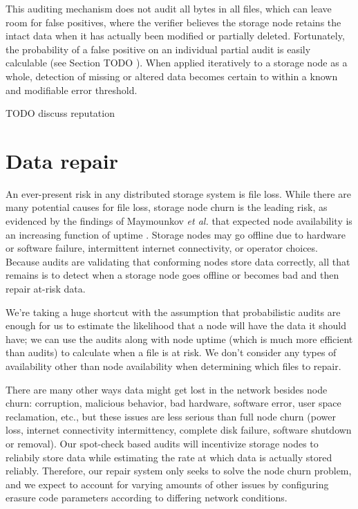 \documentclass[11pt,fleqn,openany]{book}
\newcommand{\todo}[1]{{\color{red} TODO #1 }}
\begin{document}
This auditing mechanism does not audit all bytes in all files, which can
leave room for false positives, where the verifier believes the storage node
retains the intact data when it has actually been modified or partially
deleted. Fortunately, the probability of a false positive on an individual
partial audit is easily calculable (see Section \todo{}). When applied
iteratively to a storage node as a whole, detection of missing or altered data
becomes certain to within a known and modifiable error threshold.

\todo{discuss reputation}

\section{Data repair}

An ever-present risk in any distributed storage system is file loss. While there
are many potential causes for file loss, storage node churn is the leading
risk, as evidenced by the findings of Maymounkov {\em et al.} that expected node
availability is an increasing function of uptime \cite{kad}. Storage nodes
may go offline due to hardware or software failure, intermittent internet
connectivity, or operator choices.
Because audits are validating that conforming nodes store data correctly, all
that remains is to detect when a storage node goes offline or becomes bad and
then repair at-risk data.

We're taking a huge shortcut with the assumption that
probabilistic audits are enough for us to estimate the likelihood that a node
will have the data it should have; we can use the audits
along with node uptime (which is much more efficient than audits)
to calculate when a file is at risk.
We don't consider any types of availability other than node availability when
determining which files to repair.

There are many other ways data might get lost in the network besides node churn:
corruption, malicious behavior, bad hardware, software error, user space
reclamation, etc., but these issues are less serious than full node
churn (power loss, internet connectivity intermittency, complete disk failure,
software shutdown or removal).
Our spot-check based audits will incentivize storage nodes to reliabily store
data
while estimating the rate at which data is actually stored reliably.
Therefore, our repair system only seeks to solve the node churn problem, and
we expect to account for varying
amounts of other issues by configuring erasure code
parameters according to differing network conditions.
\end{document}
